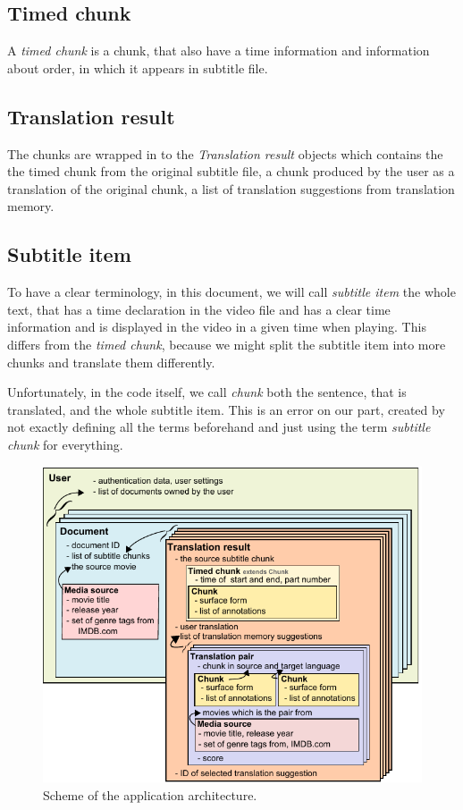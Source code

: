 \subsection*{Timed chunk}
A \emph{timed chunk} is a chunk, that also have a time information and information about order, in which it appears in subtitle file.

\subsection*{Translation result}
The chunks are wrapped in to the \emph{Translation result} objects which contains the the timed chunk from the original subtitle file, a chunk produced by the user as a translation of the original chunk, a list of translation suggestions from translation memory.

\subsection*{Subtitle item}
To have a clear terminology, in this document, we will call \emph{subtitle item} the whole text, that has a time declaration in the video file and has a clear time information and is displayed in the video in a given time when playing. This differs from the \emph{timed chunk}, because we might split the subtitle item into more chunks and translate them differently.

Unfortunately, in the code itself, we call \emph{chunk} both the sentence, that is translated, and the whole subtitle item. This is an error on our part, created by not exactly defining all the terms beforehand and just using the term \emph{subtitle chunk} for everything.


\begin{figure}[h]
\begin{center}
\includegraphics{figures/shared_classes.pdf}
\end{center}
\caption{Scheme of the application architecture.}\label{projectStructure:logical}
\end{figure}

